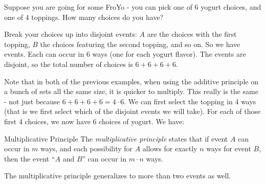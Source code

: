 \documentclass[12pt]{article}
\begin{document}
\begin{example}
  Suppose you are going for some FroYo - you can pick one of 6 yogurt choices, and one of 4 toppings.  How many choices do you have?  
  
  \begin{solution}
    Break your choices up into disjoint events:  $A$ are the choices with the first topping, $B$ the choices featuring the second topping, and so on.  So we have events.  Each can occur in 6 ways (one for each yogurt flavor).  The events are disjoint, so the total number of choices is $6 + 6 + 6 + 6$.
  \end{solution}


\end{example}

Note that in both of the previous examples, when using the additive principle on a bunch of sets all the same size, it is quicker to multiply.  This really is the same - not just because $6 + 6 + 6 + 6 = 4\cdot 6$.  We can first select the topping in 4 ways (that is we first select which of the disjoint events we will take).  For each of those first 4 choices, we now have 6 choices of yogurt.  We have:

\begin{defbox}{Multiplicative Principle}
  The {\em multiplicative principle} states that if event $A$ can occur in $m$ ways, and each possibility for $A$ allows for exactly $n$ ways for event $B$, then the event ``$A$ and $B$'' can occur in $m \cdot n$ ways.
\end{defbox}

The multiplicative principle generalizes to more than two events as well.
\end{document}
